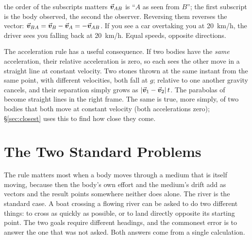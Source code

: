 \begin{trapbox}{the order of the subscripts matters}
$\vec{\bm{v}}_{AB}$ is ``$A$ as seen from $B$''; the first subscript is the body observed, the second the
observer. Reversing them reverses the vector: $\vec{\bm{v}}_{BA}=\vec{\bm{v}}_B-\vec{\bm{v}}_A=-\vec{\bm{v}}_{AB}$. If you see a car
overtaking you at \SI{20}{km/h}, the driver sees you falling back at \SI{20}{km/h}. Equal speeds,
opposite directions.
\end{trapbox}

The acceleration rule has a useful consequence. If two bodies have the \emph{same} acceleration,
their relative acceleration is zero, so each sees the other move in a straight line at constant
velocity. Two stones thrown at the same instant from the same point, with different velocities, both
fall at $g$; relative to one another gravity cancels, and their separation simply grows as
$|\vec{\bm{v}}_1-\vec{\bm{v}}_2|\,t$. The parabolas of  become straight lines in the right frame.
The same is true, more simply, of two bodies that both move at constant velocity (both accelerations
zero); \S\ref{sec:closest} uses this to find how close they come.

\begin{figure}[htbp]
\centering
{}
\end{figure}

\section{The Two Standard Problems}

The rule matters most when a body moves through a medium that is itself moving, because then the
body's own effort and the medium's drift add as vectors and the result points somewhere neither does
alone. The river is the standard case. A boat crossing a flowing river can be asked to do two different things: to cross as quickly as possible, or
to land directly opposite its starting point. The two goals require different headings, and the commonest
error is to answer the one that was not asked. Both answers come from a single calculation.

